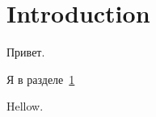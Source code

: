 \documentclass[a4paper, 12pt]{article}
\begin{document}
    \section{Introduction}\label{sec:introduction}
    Привет.~\cite{managementsystem}

    Я в разделе~\ref{sec:introduction}

    Hellow.

    
    
\end{document}

